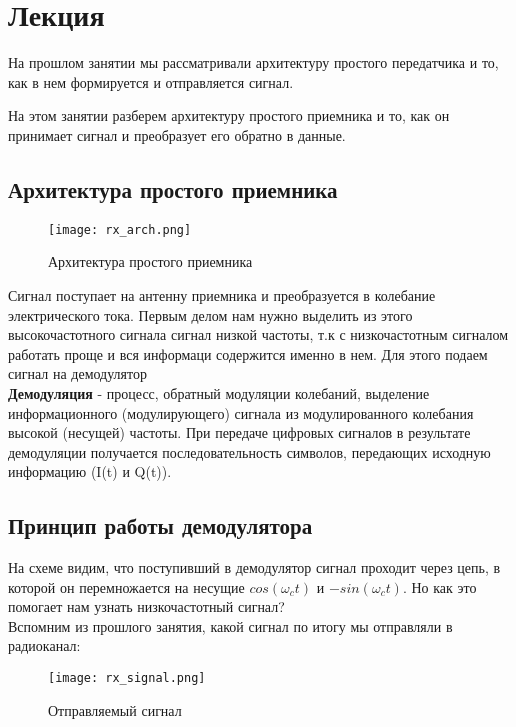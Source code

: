 \chapter{Лекция}
\label{ch:intro}

На прошлом занятии мы рассматривали архитектуру простого передатчика и то, как в нем формируется и отправляется сигнал.

На этом занятии разберем архитектуру простого приемника и то, как он принимает сигнал и преобразует его обратно в данные.

\section*{\textbf{Архитектура простого приемника}}

\begin{figure}[H]
    \centering
    \texttt{[image: rx\_arch.png]}
    \caption{Архитектура простого приемника}
\end{figure}

Сигнал поступает на антенну приемника и преобразуется в колебание электрического тока. Первым делом нам нужно выделить из этого
высокочастотного сигнала сигнал низкой частоты, т.к с низкочастотным сигналом работать проще и вся информаци содержится именно в нем.
Для этого подаем сигнал на демодулятор \\

\textbf{Демодуляция} - процесс, обратный модуляции колебаний, выделение информационного (модулирующего) сигнала из 
модулированного колебания высокой (несущей) частоты.  При передаче цифровых сигналов в результате демодуляции получается 
последовательность символов, передающих исходную информацию (I(t) и Q(t)).

\section*{\textbf{Принцип работы демодулятора}}

На схеме видим, что поступивший в демодулятор сигнал проходит через цепь, в которой он перемножается на несущие $cos(\omega_ct)$ и
$-sin(\omega_ct)$. Но как это помогает нам узнать низкочастотный сигнал? \\

Вспомним из прошлого занятия, какой сигнал по итогу мы отправляли в радиоканал:

\begin{figure}[H]
    \centering
    \texttt{[image: rx\_signal.png]}
    \caption{Отправляемый сигнал}
\end{figure}

